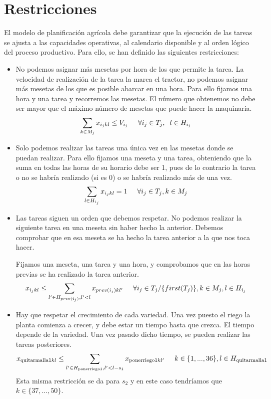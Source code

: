 \section*{Restricciones}
El modelo de planificación agrícola debe garantizar que la ejecución de las tareas se ajusta a las capacidades operativas,
al calendario disponible y al orden lógico del proceso productivo. Para ello, se han definido las siguientes restricciones:
\begin{itemize}
    \item  No podemos asignar más mesetas por hora de los que permite la tarea.
           La velocidad de realización de la tarea la marca el tractor, no podemos asignar más mesetas de los que es posible abarcar en una hora.
           Para ello fijamos una hora y una tarea y recorremos las mesetas. El número que obtenemos no debe ser mayor que el máximo número de mesetas que puede hacer la maquinaria. 
	    \[
            \sum_{k\in M_j}x_{i_j kl} \leq V_{i_j} \hspace{0.5cm} \forall i_j \in T_j, \hspace{0.2cm} l\in H_{i_j}
        \]
    \item  Solo podemos realizar las tareas una única vez en las mesetas donde se puedan realizar.
           Para ello fijamos una meseta y una tarea, obteniendo que la suma en todas las horas de su horario debe ser 1,
           pues de lo contrario la tarea o no se habría realizado (si es 0) o se habría realizado más de una vez. 
        \[
	        \sum_{l\in H_{i_j}}x_{i_j kl} =1 \hspace{0.5cm} \forall i_j \in T_j , k \in M_j
        \]
    \item Las tareas siguen un orden que debemos respetar.
          No podemos realizar la siguiente tarea en una meseta sin haber hecho la anterior.
          Debemos comprobar que en esa meseta se ha hecho la tarea anterior a la que nos toca hacer. 
	
	      Fijamos una meseta, una tarea y una hora, y comprobamos que en las horas previas se ha realizado la tarea anterior. 
        \[
	        x_{i_j kl} \leq \sum_{l' \in H_{prev(i_j)}, l'<l}x_{prev(i_j)kl'} \hspace{0.5cm} \forall i_j\in T_j/\{first(T_j)\}, k\in M_j, l \in H_{i_j}
        \]
	
    \item  Hay que respetar el crecimiento de cada variedad. Una vez puesto el riego la planta comienza a crecer,
           y debe estar un tiempo hasta que crezca. El tiempo depende de la variedad.
           Una vez pasado dicho tiempo, se pueden realizar las tareas posteriores.
        \[
	        x_{\text{quitarmalla}1 kl} \leq \sum_{l'\in H_{\text{ponerriego}1}, l'<l-s_1}x_{\text{ponerriego}1kl'} \hspace{0.5cm} k\in \{1, ..., 36\}, l\in H_{\text{quitarmalla}1}
        \]
	    Esta misma restricción se da para $s_2$ y en este caso tendríamos que $k \in \{37, ..., 50\}$. 
	

\end{itemize}
